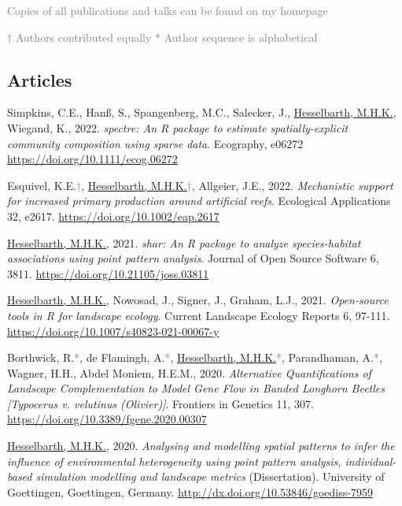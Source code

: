 \documentclass[hidelinks]{report}
\begin{document}
\textcolor{grey}{\footnotesize{Copies of all publications and talks can be found on my homepage}}

\textcolor{grey}{\footnotesize{† Authors contributed equally \hspace{1em} * Author sequence is alphabetical}}

\subsection*{Articles}

\begin{hangparas}{7.5mm}{1}

Simpkins, C.E., Hanß, S., Spangenberg, M.C., Salecker, J., \underline{Hesselbarth, M.H.K.}, Wiegand, K., 2022. \textit{spectre: An R package to estimate spatially-explicit community composition using sparse data}. Ecography, e06272 \url{https://doi.org/10.1111/ecog.06272}

Esquivel, K.E.\textcolor{grey}{†}, \underline{Hesselbarth, M.H.K.}\textcolor{grey}{†}, Allgeier, J.E., 2022. \textit{Mechanistic support for increased primary production around artificial reefs}. Ecological Applications 32, e2617. \url{https://doi.org/10.1002/eap.2617}

\underline{Hesselbarth, M.H.K.}, 2021. \textit{shar: An R package to analyze species-habitat associations using point pattern analysis}. Journal of Open Source Software 6, 3811. \url{https://doi.org/10.21105/joss.03811}

\underline{Hesselbarth, M.H.K.}, Nowosad, J., Signer, J., Graham, L.J., 2021. \textit{Open-source tools in R for landscape ecology}. Current Landscape Ecology Reports 6, 97-111. \url{https://doi.org/10.1007/s40823-021-00067-y}

Borthwick, R.\textcolor{grey}{*}, de Flamingh, A.\textcolor{grey}{*}, \underline{Hesselbarth, M.H.K.}\textcolor{grey}{*}, Parandhaman, A.\textcolor{grey}{*}, Wagner, H.H., Abdel Moniem, H.E.M., 2020. \textit{Alternative Quantifications of Landscape Complementation to Model Gene Flow in Banded Longhorn Beetles [Typocerus v. velutinus (Olivier)]}. Frontiers in Genetics 11, 307. \url{https://doi.org/10.3389/fgene.2020.00307}

\underline{Hesselbarth, M.H.K.}, 2020. \textit{Analysing and modelling spatial patterns to infer the influence of environmental heterogeneity using point pattern analysis, individual-based simulation modelling and landscape metrics} (Dissertation). University of Goettingen, Goettingen, Germany. \url{http://dx.doi.org/10.53846/goediss-7959}


\end{hangparas}
\end{document}
